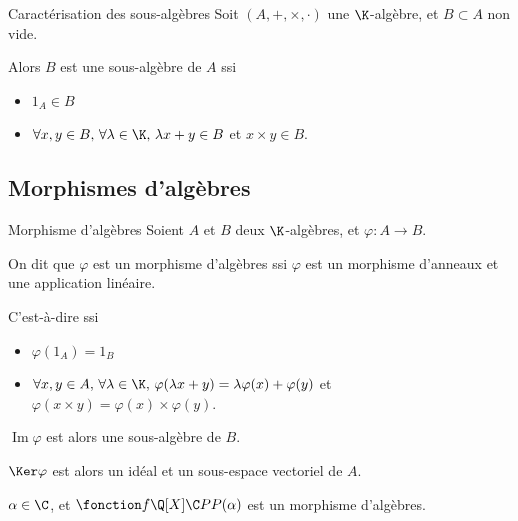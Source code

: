 \begin{proposition}{Caractérisation des sous-algèbres}{}
    Soit $(A, +, \times, \cdot)$ une $\K$-algèbre, et $B \subset A$ non vide. 

    Alors $B$ est une sous-algèbre de $A$ ssi 
    \begin{itemize}
        \item $1_A \in B$
        \item $\forall x, y \in B, \, \forall \lambda \in \K, \, \lambda x + y \in B$ et $x \times y \in B$.
    \end{itemize}
\end{proposition}

\subsection{Morphismes d'algèbres}

\begin{definition}{Morphisme d'algèbres}{}
    Soient $A$ et $B$ deux $\K$-algèbres, et $\varphi : A \to B$.

    On dit que $\varphi$ est un morphisme d'algèbres ssi $\varphi$ est un 
    morphisme d'anneaux et une application linéaire.

    C'est-à-dire ssi 
    \begin{itemize}
        \item $\varphi(1_A) = 1_B$
        \item $\forall x, y \in A, \, \forall \lambda \in \K, \, \varphi(\lambda x + y) = \lambda \varphi(x) + \varphi(y)$
        et $\varphi(x \times y) = \varphi(x) \times \varphi(y)$.
    \end{itemize}
\end{definition}

\begin{remarque}
    $\operatorname{Im} \varphi$ est alors une sous-algèbre de $B$.

    $\Ker \varphi$ est alors un idéal et un sous-espace vectoriel de $A$.
\end{remarque}

\begin{exemple}
    $\alpha \in \C$, et $\fonction f {\Q[X]} \C P {P(\alpha)}$ est un morphisme d'algèbres.
\end{exemple}
